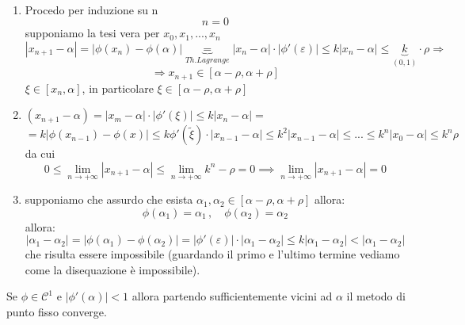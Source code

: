 \documentclass[12pt,a4paper,]{report}
\begin{document}
\begin{dimostrazione}
    $ $
    \begin{enumerate}
        \item Procedo per induzione su n
        \[
        n = 0
        \]
        supponiamo la tesi vera per $x_0,x_1,..., x_n$
        \[
        |x_{n+1} - \alpha| = |\phi(x_n) - \phi(\alpha)| \underbrace{=}_{Th. Lagrange} |x_n-\alpha | \cdot |\phi'(\varepsilon)|  \leq k|x_n - \alpha| \leq \underbrace{k}_{(0,1)} \cdot \rho \Rightarrow
        \]
        \[
        \Rightarrow x_{n+1} \in [\alpha - \rho, \alpha + \rho]
        \]
        $\xi \in [x_n, \alpha]$, in particolare $\xi \in [\alpha - \rho, \alpha + \rho]$
        \item $(x_{n+1} - \alpha) = |x_m - \alpha| \cdot |\phi'(\xi)| \leq k |x_n-\alpha| =$ 
        \[
        = k |\phi(x_{n-1})-\phi(x)| \leq k\phi'(\tilde{\xi})\cdot |x_{n-1}-\alpha| \leq k^2|x_{n-1} -\alpha|\leq ... \leq k^n|x_0 - \alpha | \leq k^n\rho
        \]
        da cui
        \[
        0 \le \lim_{n\to + \infty} |x_{n+1} - \alpha| 
        \le \lim_{n\to + \infty} k^n - \rho = 0 
        \implies \lim_{n\to + \infty} |x_{n+1} - \alpha| = 0
        \]
        \item supponiamo che assurdo che esista 
        $\alpha_1, \alpha_2 \in [\alpha - \rho, \alpha + \rho]$
        allora:
        \[
            \phi(\alpha_1) = \alpha_1 \, , \quad \phi(\alpha_2) = \alpha_2
        \]
        allora:
        \[
        | \alpha_1 - \alpha_2 | = |\phi(\alpha_1) - \phi(\alpha_2) |
        = | \phi'(\varepsilon) | \cdot |\alpha_1 - \alpha_2|
        \le k |\alpha_1 - \alpha_2|
        < |\alpha_1 - \alpha_2|
        \]
        che risulta essere impossibile (guardando il primo e l'ultimo termine vediamo come la disequazione è impossibile).
        \end{enumerate}
\end{dimostrazione}
\begin{lezione}
    [Lezione 20 10/05]
\end{lezione}

\begin{teorema}
    Se $\phi\in \mathcal{C}^1$ e $|\phi'(\alpha)| < 1$ allora partendo sufficientemente vicini ad $\alpha$ il metodo di punto fisso converge.
\end{teorema}
\end{document}
